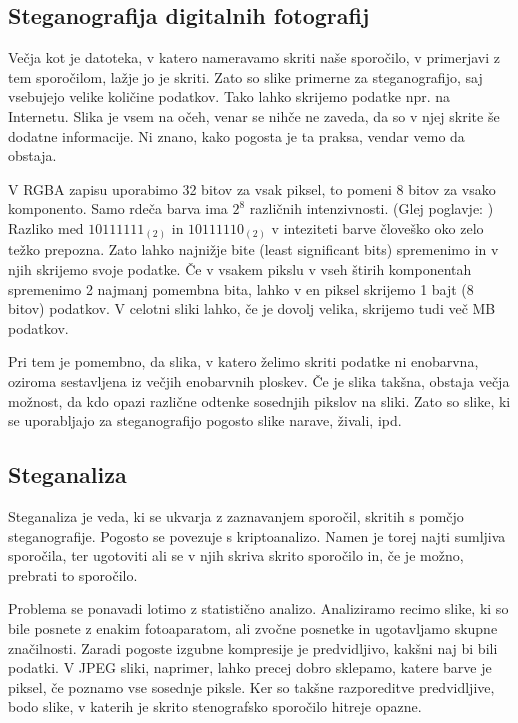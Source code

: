 \documentclass[a4paper, 12pt]{article}
\begin{document}
    \subsection{Steganografija digitalnih fotografij}
        \label{steganografijaslik}
        Večja kot je datoteka, v katero nameravamo skriti naše sporočilo, v primerjavi z tem sporočilom, lažje jo je skriti. Zato so slike primerne za steganografijo, saj vsebujejo velike količine podatkov. Tako lahko skrijemo podatke npr. na Internetu. Slika je vsem na očeh, venar se nihče ne zaveda, da so v njej skrite še dodatne informacije. Ni znano, kako pogosta je ta praksa, vendar vemo da obstaja.
        
        V RGBA zapisu uporabimo 32 bitov za vsak piksel, to pomeni 8 bitov za vsako komponento. Samo rdeča barva ima $2^8$ različnih intenzivnosti. (Glej poglavje: ) Razliko med $10111111_{(2)}$ in $10111110_{(2)}$ v inteziteti barve človeško oko zelo težko prepozna. Zato lahko najnižje bite (least significant bits) spremenimo in v njih skrijemo svoje podatke. Če v vsakem pikslu v vseh štirih komponentah spremenimo 2 najmanj pomembna bita, lahko v en piksel skrijemo 1 bajt (8 bitov) podatkov. V celotni sliki lahko, če je dovolj velika, skrijemo tudi več MB podatkov.

        Pri tem je pomembno, da slika, v katero želimo skriti podatke ni enobarvna, oziroma sestavljena iz večjih enobarvnih ploskev. Če je slika takšna, obstaja večja možnost, da kdo opazi različne odtenke sosednjih pikslov na sliki. Zato so slike, ki se uporabljajo za steganografijo pogosto slike narave, živali, ipd.

    \subsection{Steganaliza}
        Steganaliza je veda, ki se ukvarja z zaznavanjem sporočil, skritih s pomčjo steganografije. Pogosto se povezuje s kriptoanalizo. Namen je torej najti sumljiva sporočila, ter ugotoviti ali se v njih skriva skrito sporočilo in, če je možno, prebrati to sporočilo.

        Problema se ponavadi lotimo z statistično analizo. Analiziramo recimo slike, ki so bile posnete z enakim fotoaparatom, ali zvočne posnetke in ugotavljamo skupne značilnosti. Zaradi pogoste izgubne kompresije je predvidljivo, kakšni naj bi bili podatki. V JPEG sliki, naprimer, lahko precej dobro sklepamo, katere barve je piksel, če poznamo vse sosednje piksle. Ker so takšne razporeditve predvidljive, bodo slike, v katerih je skrito stenografsko sporočilo hitreje opazne.
\end{document}
